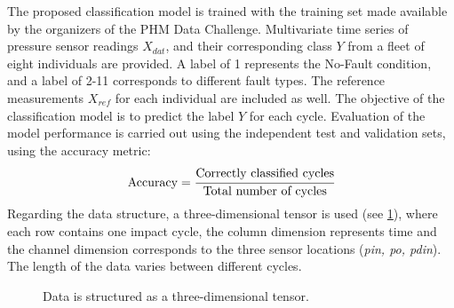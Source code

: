 The proposed classification model is trained with the training set made available by the organizers of the PHM Data Challenge.
Multivariate time series of pressure sensor readings $X_{dat}$, and their corresponding class $Y$ from a fleet of eight individuals are provided. A label of 1 represents the No-Fault condition, and a label of 2-11 corresponds to different fault types. 
The reference measurements $X_{ref}$ for each individual are included as well. 
The objective of the classification model is to predict the label $Y$ for each cycle.
Evaluation of the model performance is carried out using the independent test and validation sets, using the accuracy metric:
\begin{equation}\label{eq:phm_accuracy}
\text{Accuracy} = \cfrac{\text{Correctly classified cycles}}{\text{Total number of cycles}}
\end{equation}
Regarding the data structure, a three-dimensional tensor is used (see \cref{fig:channel}), where each row contains one impact cycle, the column dimension represents time and the channel dimension corresponds to the three sensor locations (\textit{pin, po, pdin}). The length of the data varies between different cycles.



\begin{figure}[!htb]
\begin{center}
\vspace{-0.5cm}
\end{center}
\caption{Data is structured as a three-dimensional tensor.}
\label{fig:channel}
\end{figure}


